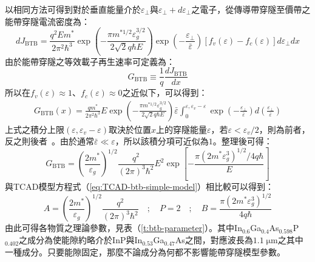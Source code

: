 以相同方法可得到對於垂直能量介於$\varepsilon_\perp$與$\varepsilon_\perp+d\varepsilon_\perp$之電子，從傳導帶穿隧至價帶之能帶穿隧電流密度為：
\begin{equation}
dJ_\text{BTB}=\frac{q^2Em^*}{2\pi^2\hbar^3}\exp\left(-\frac{\pi m^{*1/2}\varepsilon_g^{3/2}}{2\sqrt{2}q\hbar E}\right)\exp\left(-\frac{\varepsilon_\perp}{\bar{\varepsilon}}\right)\left[f_v(\varepsilon)-f_c(\varepsilon)\right]d\varepsilon_\perp dx
\end{equation}
由於能帶穿隧之等效載子再生速率可定義為：
\begin{equation}
G_\text{BTB}\equiv\frac{1}{q}\frac{dJ_\text{BTB}}{dx}
\end{equation}
所以在$f_v(\varepsilon)\approx1$、$f_c(\varepsilon)\approx0$之近似下，可以得到：
\begin{equation}
\begin{aligned}
G_\text{BTB}(x)=\frac{qm^*}{2\pi^2\hbar^3}E\exp\left(-\frac{\pi m^{*1/2}\varepsilon_g^{3/2}}{2\sqrt{2}q\hbar E}\right)\bar{\varepsilon}\int_0^{\varepsilon,\varepsilon_v-\varepsilon}\exp\left(-\frac{\varepsilon_\perp}{\bar{\varepsilon}}\right)d\left(\frac{\varepsilon_\perp}{\bar{\varepsilon}}\right)
\end{aligned}
\end{equation}
上式之積分上限$(\varepsilon,\varepsilon_v-\varepsilon)$取決於位置$x$上的穿隧能量$\varepsilon$，若$\varepsilon<\varepsilon_v/2$，則為前者，反之則後者~\cite{PhysSMCMoll}。由於通常$\bar{\varepsilon}\ll\varepsilon$，所以該積分項可近似為$1$。整理後可得：
\begin{equation}
G_\text{BTB}=\left(\frac{2m^*}{\varepsilon_g}\right)^{1/2}\frac{q^2}{(2\pi)^3\hbar^2}E^2\exp\left[-\frac{\pi(2m^*\varepsilon_g^3)^{1/2}/4q\hbar}{E}\right]
\end{equation}
與TCAD模型方程式（\ref{eq:TCAD-btb-simple-model}）相比較可以得到：
\begin{equation}
A=\left(\frac{2m^*}{\varepsilon_g}\right)^{1/2}\frac{q^2}{(2\pi)^3\hbar^2}\quad;\quad P=2\quad;\quad B=\frac{\pi(2m^*\varepsilon_g^3)^{1/2}}{4q\hbar}\label{eq:btb-pamameters}
\end{equation}
由此可得各物質之理論參數，見表（\ref{t:btb-parameter}）。其中In$_{0.6}$Ga$_{0.4}$As$_{0.598}$P$_{0.402}$之成分為使能隙約略介於InP與In$_{0.53}$Ga$_{0.47}$As之間，對應波長為$1.1\;\mathrm{\mu m}$之其中一種成分。只要能隙固定，那麼不論成分為何都不影響能帶穿隧模型參數。
